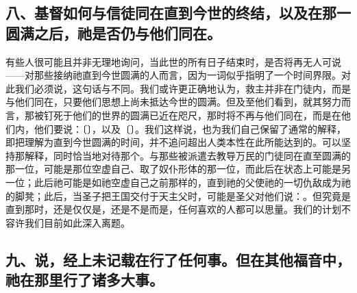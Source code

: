 
\subsection{八、基督如何与信徒同在直到今世的终结，以及在那一圆满之后，祂是否仍与他们同在。}

有些人很可能且并非无理地询问，当此世的所有日子结束时，是否将再无人可说——对那些接纳祂直到今世圆满的人而言，因为一词似乎指明了一个时间界限。对此我们必须说，这句话与不同。我们或许更正确地认为，救主并非在门徒内，而是与他们同在，只要他们思想上尚未抵达今世的圆满。但及至他们看到，就其努力而言，那被钉死于他们的世界的圆满已近在咫尺，那时将不再与他们同在，而是在他们内，他们要说：〔〕，以及〔〕。我们这样说，也为我们自己保留了通常的解释，即把理解为直到今世圆满的时间，并不追问超出人类本性在此所能达到的。可以坚持那解释，同时恰当地对待那个。与那些被派遣去教导万民的门徒同在直至圆满的那一位，可能是那位空虚自己、取了奴仆形体的那一位，而此后在状态上可能是另一位；此后祂可能是如祂空虚自己之前那样的，直到祂的父使祂的一切仇敌成为祂的脚凳；此后，当圣子把王国交付于天主父时，可能是圣父对他们说：。但究竟是直到那时，还是仅仅是，还是不是而是，任何喜欢的人都可以思量。我们的计划不容许我们目前如此深入离题。\par


\subsection{九、说，经上未记载在行了任何事。但在其他福音中，祂在那里行了诸多大事。}

